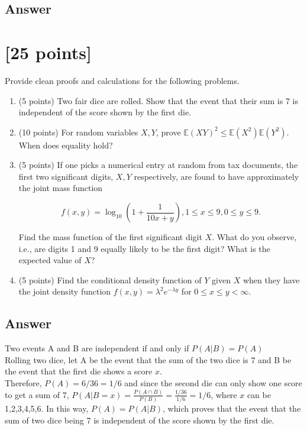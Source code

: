 \subsection{Answer}


\newpage 

\section{ [25 points]} 
 

Provide clean proofs and calculations for the following problems. 

\begin{tcolorbox}
	\begin{enumerate}
		\item  (5 points)  Two fair dice are rolled. Show that the event that their sum is 7 is independent of the score shown by the first die.  
         \item  (10 points)    For random variables $X,Y$, prove $\mathbb{E}(XY)^2 \leq \mathbb{E}(X^2)\mathbb{E}(Y^2)$. When does equality hold?
    
         \item  (5 points)   If one picks a numerical entry at random from tax documents, the first two significant digits, $X, Y$ respectively, are found to have approximately the joint mass function 

         $$ f(x,y) = \log_{10}(1+\frac{1}{10x+y}), 1\leq x\leq 9, 0\leq y\leq 9.$$

         Find the mass function of the first significant digit $X$. What do you observe, i.e., are digits 1 and 9 equally likely to be the first digit? What is the expected value of $X$?  

         \item  (5 points)  Find the conditional density function  of $Y$ given $X$ when they have the joint density function $f(x,y)=\lambda^2 e^{-\lambda y}$ for $0\leq x \leq y<\infty$. 
	\end{enumerate}
\end{tcolorbox}

 \subsection{Answer}
 Two events A and B are independent if and only if $P(A|B) = P(A)$\\
 Rolling two dice, let A be the event that the sum of the two dice is 7 and
 B be the event that the first die shows a score $x$. \\
 Therefore, $P(A) = 6/36 = 1/6$ and since the second die can only show one score to get a sum of 7,
 $P(A \vert B = x) = \frac{P(A\cap B)}{P(B)} = \frac{1/36}{1/6} =1/6$, where $x$ can be 1,2,3,4,5,6.
 In this way, $P(A) = P(A \vert B)$, which proves that the event that the sum of two dice being 7 is
 independent of the score shown by the first die.

